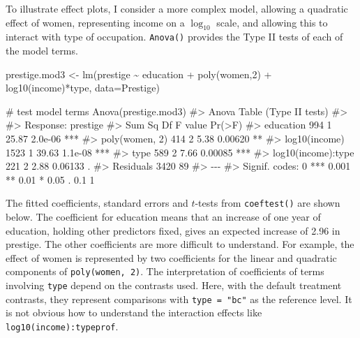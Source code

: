 \documentclass[
  letterpaper,
  10pt,
  krantz2]{krantz}
\makeatletter
\newenvironment{Shaded}{\begin{snugshade}}{\end{snugshade}}
\newcommand{\AttributeTok}[1]{\textcolor[rgb]{0.40,0.45,0.13}{#1}}
\newcommand{\CommentTok}[1]{\textcolor[rgb]{0.37,0.37,0.37}{#1}}
\newcommand{\DecValTok}[1]{\textcolor[rgb]{0.68,0.00,0.00}{#1}}
\newcommand{\FunctionTok}[1]{\textcolor[rgb]{0.28,0.35,0.67}{#1}}
\newcommand{\NormalTok}[1]{\textcolor[rgb]{0.00,0.23,0.31}{#1}}
\newcommand{\OtherTok}[1]{\textcolor[rgb]{0.00,0.23,0.31}{#1}}
\newcommand{\SpecialCharTok}[1]{\textcolor[rgb]{0.37,0.37,0.37}{#1}}
\newenvironment{kframe}{%
  \medskip{}
  \setlength{\fboxsep}{.8em}
  \def\at@end@of@kframe{}%
  \ifinner\ifhmode%
  \def\at@end@of@kframe{\end{minipage}}%
  \begin{minipage}{\columnwidth}%
  \fi\fi%
  \def\FrameCommand##1{\hskip\@totalleftmargin \hskip-\fboxsep
  \colorbox{shadecolor}{##1}\hskip-\fboxsep
      \hskip-\linewidth \hskip-\@totalleftmargin \hskip\columnwidth}%
  \MakeFramed {\advance\hsize-\width
    \@totalleftmargin\z@ \linewidth\hsize
    \@setminipage}}%
{\par\unskip\endMakeFramed%
  \at@end@of@kframe}
\renewenvironment{Shaded}{\begin{kframe}}{\end{kframe}}
\makeatother
\begin{document}
To illustrate effect plots, I consider a more complex model, allowing a
quadratic effect of women, representing income on a \(\log_{10}\) scale,
and allowing this to interact with type of occupation. \texttt{Anova()}
provides the Type II tests of each of the model terms.

\begin{Shaded}
\begin{Highlighting}[]
\NormalTok{prestige.mod3 }\OtherTok{\textless{}{-}} \FunctionTok{lm}\NormalTok{(prestige }\SpecialCharTok{\textasciitilde{}}\NormalTok{ education }\SpecialCharTok{+} \FunctionTok{poly}\NormalTok{(women,}\DecValTok{2}\NormalTok{) }\SpecialCharTok{+}
                       \FunctionTok{log10}\NormalTok{(income)}\SpecialCharTok{*}\NormalTok{type, }\AttributeTok{data=}\NormalTok{Prestige)}

\CommentTok{\# test model terms}
\FunctionTok{Anova}\NormalTok{(prestige.mod3)}
\CommentTok{\#\textgreater{} Anova Table (Type II tests)}
\CommentTok{\#\textgreater{} }
\CommentTok{\#\textgreater{} Response: prestige}
\CommentTok{\#\textgreater{}                    Sum Sq Df F value  Pr(\textgreater{}F)    }
\CommentTok{\#\textgreater{} education             994  1   25.87 2.0e{-}06 ***}
\CommentTok{\#\textgreater{} poly(women, 2)        414  2    5.38 0.00620 ** }
\CommentTok{\#\textgreater{} log10(income)        1523  1   39.63 1.1e{-}08 ***}
\CommentTok{\#\textgreater{} type                  589  2    7.66 0.00085 ***}
\CommentTok{\#\textgreater{} log10(income):type    221  2    2.88 0.06133 .  }
\CommentTok{\#\textgreater{} Residuals            3420 89                    }
\CommentTok{\#\textgreater{} {-}{-}{-}}
\CommentTok{\#\textgreater{} Signif. codes:  0 \textquotesingle{}***\textquotesingle{} 0.001 \textquotesingle{}**\textquotesingle{} 0.01 \textquotesingle{}*\textquotesingle{} 0.05 \textquotesingle{}.\textquotesingle{} 0.1 \textquotesingle{} \textquotesingle{} 1}
\end{Highlighting}
\end{Shaded}

The fitted coefficients, standard errors and \(t\)-tests from
\texttt{coeftest()} are shown below. The coefficient for education means
that an increase of one year of education, holding other predictors
fixed, gives an expected increase of 2.96 in prestige. The other
coefficients are more difficult to understand. For example, the effect
of women is represented by two coefficients for the linear and quadratic
components of \texttt{poly(women,\ 2)}. The interpretation of
coefficients of terms involving \texttt{type} depend on the contrasts
used. Here, with the default treatment contrasts, they represent
comparisons with \texttt{type\ =\ "bc"} as the reference level. It is
not obvious how to understand the interaction effects like
\texttt{log10(income):typeprof}.
\end{document}
